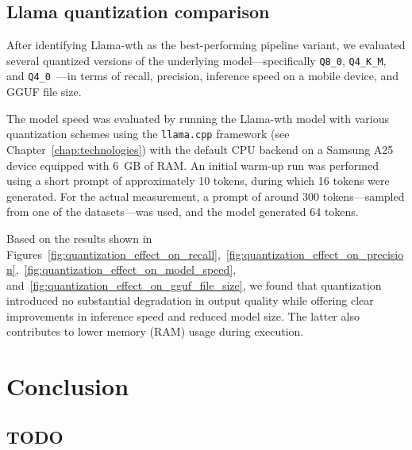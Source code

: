 \documentclass[licencjacka,en]{pracamgr}
\let\cleardoublepage\clearpage
\begin{document}
\section{Llama quantization comparison}

After identifying Llama-wth as the best-performing pipeline variant, we evaluated several quantized versions of the underlying model—specifically \texttt{Q8\_0}, \texttt{Q4\_K\_M}, and \texttt{Q4\_0}~\cite{llama-cpp-quantization}—in terms of recall, precision, inference speed on a mobile device, and GGUF file size.

The model speed was evaluated by running the Llama-wth model with various quantization schemes using the \texttt{llama.cpp} framework (see Chapter~\ref{chap:technologies}) with the default CPU backend on a Samsung A25 device equipped with 6~GB of RAM. An initial warm-up run was performed using a short prompt of approximately 10 tokens, during which 16 tokens were generated. For the actual measurement, a prompt of around 300 tokens—sampled from one of the datasets—was used, and the model generated 64 tokens.

Based on the results shown in Figures~\ref{fig:quantization_effect_on_recall},~\ref{fig:quantization_effect_on_precision},~\ref{fig:quantization_effect_on_model_speed}, and~\ref{fig:quantization_effect_on_gguf_file_size}, we found that quantization introduced no substantial degradation in output quality while offering clear improvements in inference speed and reduced model size. The latter also contributes to lower memory (RAM) usage during execution.

\chapter{Conclusion} \label{chap:conclusion}
\section{TODO}

\let\cleardoublepage\clearpage
\end{document}
